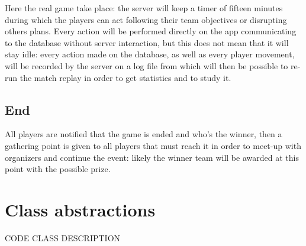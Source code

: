 				Here the real game take place: the server will keep a timer of fifteen minutes during which the players can act following their team objectives or disrupting others plans.
				Every action will be performed directly on the app communicating to the database without server interaction, but this does not mean that it will stay idle: every action made on the database, as well as every player movement, will be recorded by the server on a log file from which will then be possible to re-run the match replay in order to get statistics and to study it.
			
		\subsection{End}
		
			All players are notified that the game is ended and who's the winner, then a gathering point is given to all players that must reach it in order to meet-up with organizers and continue the event: likely the winner team will be awarded at this point with the possible prize.
			
	\section{Class abstractions}
	
		CODE CLASS DESCRIPTION